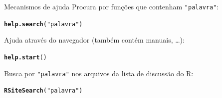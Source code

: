 \documentclass[10pt,handout]{beamer}\usepackage[]{graphicx}\usepackage[]{color}
\makeatletter
\newcommand{\hlstr}[1]{\textcolor[rgb]{0.282,0.239,0.545}{#1}}%
\newcommand{\hlstd}[1]{\textcolor[rgb]{0.345,0.345,0.345}{#1}}%
\newcommand{\hlkwd}[1]{\textcolor[rgb]{0.282,0.239,0.545}{\textbf{#1}}}%
\newenvironment{kframe}{%
 \def\at@end@of@kframe{}%
 \ifinner\ifhmode%
  \def\at@end@of@kframe{\end{minipage}}%
  \begin{minipage}{\columnwidth}%
 \fi\fi%
 \def\FrameCommand##1{\hskip\@totalleftmargin \hskip-\fboxsep
 \colorbox{shadecolor}{##1}\hskip-\fboxsep
     \hskip-\linewidth \hskip-\@totalleftmargin \hskip\columnwidth}%
 \MakeFramed {\advance\hsize-\width
   \@totalleftmargin\z@ \linewidth\hsize
   \@setminipage}}%
 {\par\unskip\endMakeFramed%
 \at@end@of@kframe}
\newenvironment{knitrout}{}{} %
\makeatother
\begin{document}
\begin{frame}[fragile]{Mecanismos de ajuda}
Procura por funções que contenham \texttt{"palavra"}:
\begin{knitrout}\small
{}\color{fgcolor}\begin{kframe}
\begin{alltt}
\hlkwd{help.search}\hlstd{(}\hlstr{"palavra"}\hlstd{)}
\end{alltt}
\end{kframe}
\end{knitrout}

Ajuda através do navegador (também contém manuais, \ldots):
\begin{knitrout}\small
{}\color{fgcolor}\begin{kframe}
\begin{alltt}
\hlkwd{help.start}\hlstd{()}
\end{alltt}
\end{kframe}
\end{knitrout}

Busca por \texttt{"palavra"} nos arquivos da lista de discussão do R:
\begin{knitrout}\small
{}\color{fgcolor}\begin{kframe}
\begin{alltt}
\hlkwd{RSiteSearch}\hlstd{(}\hlstr{"palavra"}\hlstd{)}
\end{alltt}
\end{kframe}
\end{knitrout}

\end{frame}
\end{document}
